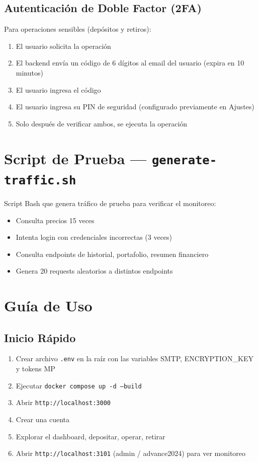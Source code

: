\documentclass[12pt,oneside]{article}
\begin{document}
\subsection{Autenticación de Doble Factor (2FA)}

Para operaciones sensibles (depósitos y retiros):
\begin{enumerate}
    \item El usuario solicita la operación
    \item El backend envía un código de 6 dígitos al email del usuario (expira en 10 minutos)
    \item El usuario ingresa el código
    \item El usuario ingresa su PIN de seguridad (configurado previamente en Ajustes)
    \item Solo después de verificar ambos, se ejecuta la operación
\end{enumerate}

\section{Script de Prueba — \texttt{generate-traffic.sh}}

Script Bash que genera tráfico de prueba para verificar el monitoreo:

\begin{itemize}
    \item Consulta precios 15 veces
    \item Intenta login con credenciales incorrectas (3 veces)
    \item Consulta endpoints de historial, portafolio, resumen financiero
    \item Genera 20 requests aleatorios a distintos endpoints
\end{itemize}

\section{Guía de Uso}

\subsection{Inicio Rápido}

\begin{enumerate}
    \item Crear archivo \texttt{.env} en la raíz con las variables SMTP, ENCRYPTION\_KEY y tokens MP
    \item Ejecutar \texttt{docker compose up -d --build}
    \item Abrir \texttt{http://localhost:3000}
    \item Crear una cuenta
    \item Explorar el dashboard, depositar, operar, retirar
    \item Abrir \texttt{http://localhost:3101} (admin / advance2024) para ver monitoreo
\end{enumerate}
\end{document}
